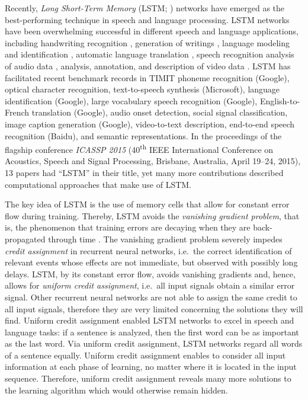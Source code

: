 \documentclass{article}
\begin{document}
\begin{appendices}
Recently, {\em Long Short-Term Memory} (LSTM; \cite{Hochreiter:91,Hochreiter:95,Hochreiter:97})
networks have emerged as the best-performing technique in speech and language processing.
LSTM networks have been overwhelming successful in different speech and language applications,
including handwriting recognition \cite{Graves:09}, generation of writings
\cite{Graves:13}, language modeling and identification \cite{Gonzalez-Dominguez:14,Zaremba:14arxiva},
automatic language translation \cite{Sutskever:14nips}, 
speech recognition \cite{Sak:14,Geiger:14}
analysis of audio data \cite{Marchi:14}, analysis, annotation, and
description of video data \cite{Donahue:14,Venugopalan:14,Srivastava:15}. 
LSTM has facilitated recent benchmark records in TIMIT phoneme recognition (Google),
optical character recognition, text-to-speech synthesis (Microsoft),
language identification (Google), large vocabulary speech recognition (Google),
English-to-French translation (Google), audio onset detection, social signal classification,
image caption generation (Google), video-to-text description, end-to-end speech recognition (Baidu),
and semantic representations. In the proceedings of the flagship conference {\em ICASSP 2015}
(40\textsuperscript{th} IEEE International Conference on Acoustics, Speech and Signal
Processing, Brisbane, Australia, April 19--24, 2015), 13 papers had ``LSTM'' in their
title, yet many more contributions described computational approaches that make use of LSTM.

The key idea of LSTM is the use of memory cells that allow for constant error flow
during training. Thereby, LSTM avoids the {\em vanishing gradient problem}, that is,
the phenomenon that training errors are decaying when they are back-propagated through time
\cite{Hochreiter:91,Hochreiter:00}.
The vanishing gradient problem severely impedes {\em credit assignment} in recurrent neural
networks, i.e.\ the correct identification of relevant events whose effects are not
immediate, but observed with possibly long delays.
LSTM, by its constant error flow, avoids vanishing gradients and, hence, allows for
{\em uniform credit assignment}, i.e.\ all input signals obtain a similar error signal.
Other recurrent neural networks are not able to assign the same credit to all input signals,
therefore they are very limited concerning the solutions they will
find. Uniform credit assignment enabled LSTM networks to excel in speech and
language tasks: if a sentence is analyzed, then the first word can be as important as
the last word. Via uniform credit assignment, LSTM networks regard all words of a sentence equally.
Uniform credit assignment enables to consider all input information
at each phase of learning, no matter where it is located in the input
sequence. Therefore, uniform credit assignment reveals many more
solutions to the learning algorithm which would otherwise remain hidden. 


\end{appendices}
\end{document}
